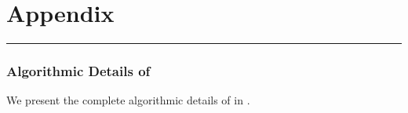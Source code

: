 \clearpage
\raggedbottom
\appendix 
\part{Appendix}
\startcontents
{}
\vskip3pt\hrule\vskip5pt
\clearpage 







\section{Algorithmic Details of \name} 
\label{app:algorithmic_details}

We present the complete algorithmic details of \name in .

